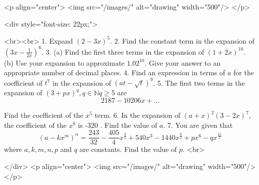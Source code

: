 <p align="center">
<img src="/images/" alt="drawing" width="500"/>
</p>

<div style="font-size: 22px;">

<br><br>
1. Expand $(2-3 x)^{5}$.
2. Find the constant term in the expansion of $\left(3 x-\frac{1}{2 x}\right)^{6}$.
3. (a) Find the first three terms in the expansion of $(1+2 x)^{10}$.
(b) Use your expansion to approximate $1.02^{10}$. Give your answer to an appropriate number of decimal places.
4. Find an expression in terms of $a$ for the coefficient of $t^{7}$ in the expansion of $(a t-\sqrt{t})^{9}$.
5. The first two terms in the expansion of $(3+p x)^{q}, q \in \mathbb{N} q \geq 5$ are
$$
2187-10206 x+\ldots
$$

Find the coefficient of the $x^{5}$ term.
6. In the expansion of $(a+x)^{2}(3-2 x)^{7}$, the coefficient of the $x^{8}$ is -320 . Find the value of $a$.
7. You are given that
$$
\left(a-k x^{m}\right)^{n}=\frac{243}{32}-\frac{405}{4} x^{\frac{3}{2}}+540 x^{3}-1440 x^{\frac{9}{2}}+p x^{6}-q x^{\frac{15}{2}}
$$
where $a, k, m, n, p$ and $q$ are constants.
Find the value of $p$.
<br>

</div>
<p align="center">
<img src="/images/" alt="drawing" width="500"/>
</p>

